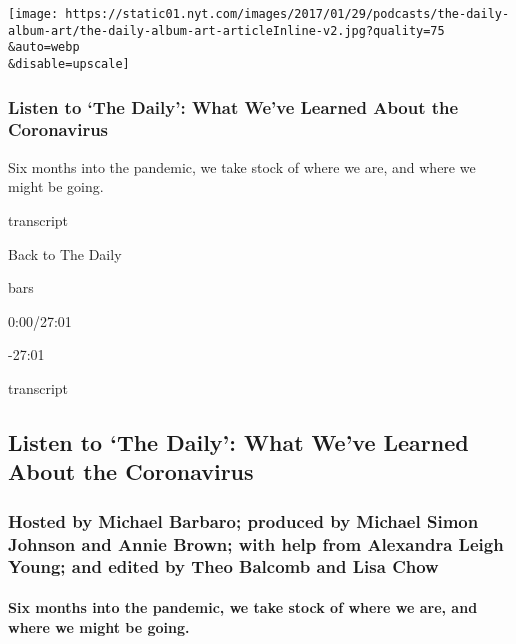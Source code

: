 \texttt{[image: https://static01.nyt.com/images/2017/01/29/podcasts/the-daily-album-art/the-daily-album-art-articleInline-v2.jpg?quality=75\\\&auto=webp\\\&disable=upscale]}

\hypertarget{listen-to-the-daily-what-weve-learned-about-the-coronavirus}{%
\subsubsection{Listen to `The Daily': What We've Learned About the
Coronavirus}\label{listen-to-the-daily-what-weve-learned-about-the-coronavirus}}

Six months into the pandemic, we take stock of where we are, and where
we might be going.

transcript

Back to The Daily

bars

0:00/27:01

-27:01

transcript

\hypertarget{listen-to-the-daily-what-weve-learned-about-the-coronavirus-1}{%
\subsection{Listen to `The Daily': What We've Learned About the
Coronavirus}\label{listen-to-the-daily-what-weve-learned-about-the-coronavirus-1}}

\hypertarget{hosted-by-michael-barbaro-produced-by-michael-simon-johnson-and-annie-brown-with-help-from-alexandra-leigh-young-and-edited-by-theo-balcomb-and-lisa-chow}{%
\subsubsection{Hosted by Michael Barbaro; produced by Michael Simon
Johnson and Annie Brown; with help from Alexandra Leigh Young; and
edited by Theo Balcomb and Lisa
Chow}\label{hosted-by-michael-barbaro-produced-by-michael-simon-johnson-and-annie-brown-with-help-from-alexandra-leigh-young-and-edited-by-theo-balcomb-and-lisa-chow}}

\hypertarget{six-months-into-the-pandemic-we-take-stock-of-where-we-are-and-where-we-might-be-going}{%
\paragraph{Six months into the pandemic, we take stock of where we are,
and where we might be
going.}\label{six-months-into-the-pandemic-we-take-stock-of-where-we-are-and-where-we-might-be-going}}

